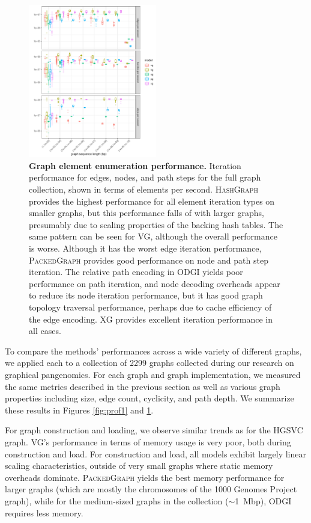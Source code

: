\documentclass[11pt]{ucthesis}
\begin{document}
\begin{figure}
  \centering
  \includegraphics[width=0.5\textwidth]{handlefigures/iteration_per_second_boxplot.pdf}
  \caption{
    \label{fig:prof2}
    \textbf{Graph element enumeration performance.}
    Iteration performance for edges, nodes, and path steps for the full graph collection, shown in terms of elements per second.
    \textsc{HashGraph} provides the highest performance for all element iteration types on smaller graphs, but this performance falls of with larger graphs, presumably due to scaling properties of the backing hash tables.
    The same pattern can be seen for \textsc{VG}, although the overall performance is worse.
    Although it has the worst edge iteration performance, \textsc{PackedGraph} provides good performance on node and path step iteration.
    The relative path encoding in \textsc{ODGI} yields poor performance on path iteration, and node decoding overheads appear to reduce its node iteration performance, but it has good graph topology traversal performance, perhaps due to cache efficiency of the edge encoding.
    \textsc{XG} provides excellent iteration performance in all cases.
    }
\end{figure}

To compare the methods' performances across a wide variety of different graphs, we applied each to a collection of 2299 graphs collected during our research on graphical pangenomics.
For each graph and graph implementation, we measured the same metrics described in the previous section as well as various graph properties including size, edge count, cyclicity, and path depth.
We summarize these results in Figures \ref{fig:prof1} and \ref{fig:prof2}.

For graph construction and loading, we observe similar trends as for the HGSVC graph.
\textsc{VG}'s performance in terms of memory usage is very poor, both during construction and load.
For construction and load, all models exhibit largely linear scaling characteristics, outside of very small graphs where static memory overheads dominate.
\textsc{PackedGraph} yields the best memory performance for larger graphs (which are mostly the chromosomes of the 1000 Genomes Project graph), while for the medium-sized graphs in the collection ($\sim$1~Mbp), \textsc{ODGI} requires less memory.
\end{document}
